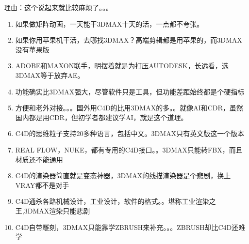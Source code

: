 \documentclass[letterpaper,12pt,english]{sphinxmanual}
\begin{document}
理由：这个说起来就比较麻烦了。。。
\begin{enumerate}
%
\item {} 
如果做矩阵动画，一天能干3DMAX十天的活，一点都不夸张。

\item {} 
如果你用苹果机干活，去哪找3DMAX？高端剪辑都是用苹果的，而3DMAX没有苹果版

\item {} 
ADOBE和MAXON联手，明摆着就是为打压AUTODESK，长远看，选3DMAX等于放弃AE。

\item {} 
功能确实比3DMAX强大，尽管软件只是工具，但功能差距始终都是个硬指标

\item {} 
方便和老外对接。。。国外用C4D的比用3DMAX的多。。就像AI和CDR，虽然国内都是用CDR，但初学者都建议学AI，就是这个道理。

\item {} 
C4D的思维粒子支持20多种语言，包括中文。3DMAX只有英文版这一个版本

\item {} 
REAL FLOW，NUKE，都有专用的C4D接口。。3DMAX只能转FBX，而且材质还不能通用

\item {} 
C4D的渲染器简直就是变态神器，3DMAX的线描渲染器是个悲剧，换上VRAY都不是对手

\item {} 
C4D通杀各路机械设计，工业设计，软件的格式。。堪称工业渲染之王,3DMAX渲染只能悲剧

\item {} 
C4D自带雕刻，3DMAX只能靠学ZBRUSH来补充。。。ZBRUSH却比C4D还难学

\end{enumerate}
\end{document}
